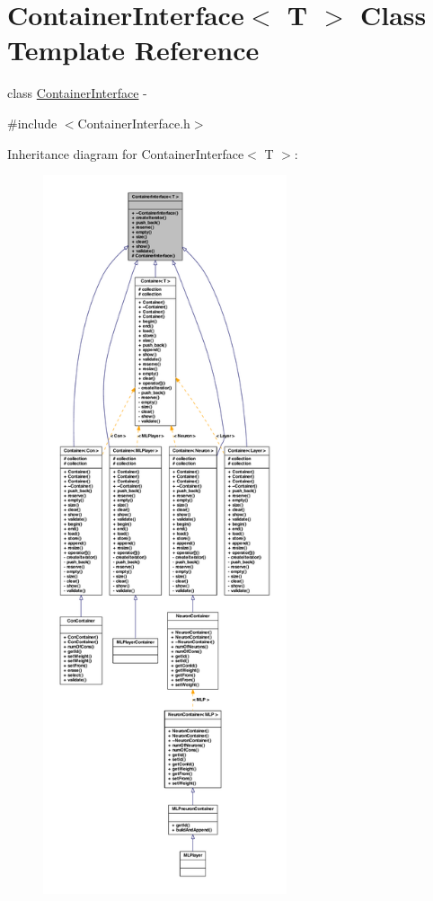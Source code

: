 \hypertarget{class_container_interface}{
\section{ContainerInterface$<$ T $>$ Class Template Reference}
\label{class_container_interface}
}


class \hyperlink{class_container_interface}{ContainerInterface} -\/  




{\ttfamily \#include $<$ContainerInterface.h$>$}



Inheritance diagram for ContainerInterface$<$ T $>$:
\nopagebreak
\begin{figure}[H]
\begin{center}
\leavevmode
\includegraphics[height=600pt]{class_container_interface__inherit__graph}
\end{center}
\end{figure}

